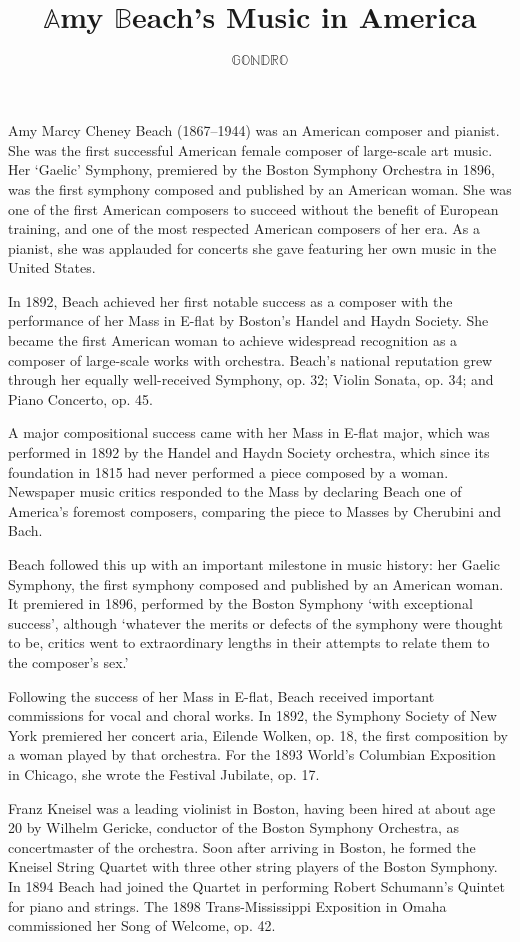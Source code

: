 \documentclass[12pt,a4paper]{article}
\title{$\mathbb A$my $\mathbb B$each's Music in $\mathbf A$merica}
\author{$\mathbb{GONDRO}$}
\date{}
\begin{document}
\maketitle

Amy Marcy Cheney Beach (1867--1944) was an American composer and pianist.
She was the first successful American female composer of large-scale art music.
Her `Gaelic' Symphony, premiered by the Boston Symphony Orchestra in 1896, was the first symphony composed and published by an American woman.
She was one of the first American composers to succeed without the benefit of European training, and one of the most respected American composers of her era.
As a pianist, she was applauded for concerts she gave featuring her own music in the United States.

In 1892, Beach achieved her first notable success as a composer with the performance of her Mass in E-flat by Boston's Handel and Haydn Society.
She became the first American woman to achieve widespread recognition as a composer of large-scale works with orchestra.
Beach's national reputation grew through her equally well-received Symphony, op. 32; Violin Sonata, op. 34; and Piano Concerto, op. 45.

A major compositional success came with her Mass in E-flat major, which was performed in 1892 by the Handel and Haydn Society orchestra,
which since its foundation in 1815 had never performed a piece composed by a woman.
Newspaper music critics responded to the Mass by declaring Beach one of America's foremost composers, comparing the piece to Masses by Cherubini and Bach.

Beach followed this up with an important milestone in music history: her Gaelic Symphony, the first symphony composed and published by an American woman.
It premiered in 1896, performed by the Boston Symphony `with exceptional success', although `whatever the merits or defects of the symphony were thought to be,
critics went to extraordinary lengths in their attempts to relate them to the composer's sex.'

Following the success of her Mass in E-flat, Beach received important commissions for vocal and choral works.
In 1892, the Symphony Society of New York premiered her concert aria, Eilende Wolken, op. 18, the first composition by a woman played by that orchestra.
For the 1893 World's Columbian Exposition in Chicago, she wrote the Festival Jubilate, op. 17.

Franz Kneisel was a leading violinist in Boston, having been hired at about age 20 by Wilhelm Gericke,
conductor of the Boston Symphony Orchestra, as concertmaster of the orchestra.
Soon after arriving in Boston, he formed the Kneisel String Quartet with three other string players of the Boston Symphony.
In 1894 Beach had joined the Quartet in performing Robert Schumann's Quintet for piano and strings.
The 1898 Trans-Mississippi Exposition in Omaha commissioned her Song of Welcome, op. 42.
\end{document}
